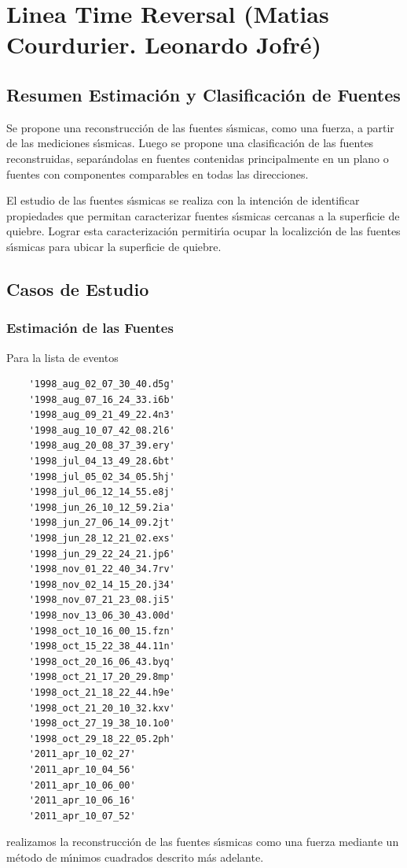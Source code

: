 
\chapter{Linea Time Reversal (Matias Courdurier. Leonardo Jofr\'e)}

\section{Resumen Estimaci\'on y Clasificaci\'on de Fuentes}

Se propone una reconstrucci\'on de las fuentes s\'{\i}smicas,
como una fuerza, a partir de las mediciones s\'{\i}smicas. Luego se propone
una clasificaci\'on de las fuentes reconstruidas, separ\'andolas en fuentes
contenidas principalmente en un plano o fuentes con componentes comparables
en todas las direcciones.

El estudio de las fuentes s\'{\i}smicas se realiza con la intenci\'on de identificar
propiedades que permitan caracterizar fuentes s\'{\i}smicas cercanas a la superficie
de quiebre. Lograr esta caracterizaci\'on permitir\'{\i}a ocupar la localizci\'on de las
fuentes s\'{\i}smicas para ubicar la superficie de quiebre.

\section{Casos de Estudio}

\subsection{Estimaci\'on de las Fuentes}

Para la lista de eventos
\begin{verbatim}
    '1998_aug_02_07_30_40.d5g'
    '1998_aug_07_16_24_33.i6b'
    '1998_aug_09_21_49_22.4n3'
    '1998_aug_10_07_42_08.2l6'
    '1998_aug_20_08_37_39.ery'
    '1998_jul_04_13_49_28.6bt'
    '1998_jul_05_02_34_05.5hj'
    '1998_jul_06_12_14_55.e8j'
    '1998_jun_26_10_12_59.2ia'
    '1998_jun_27_06_14_09.2jt'
    '1998_jun_28_12_21_02.exs'
    '1998_jun_29_22_24_21.jp6'
    '1998_nov_01_22_40_34.7rv'
    '1998_nov_02_14_15_20.j34'
    '1998_nov_07_21_23_08.ji5'
    '1998_nov_13_06_30_43.00d'
    '1998_oct_10_16_00_15.fzn'
    '1998_oct_15_22_38_44.11n'
    '1998_oct_20_16_06_43.byq'
    '1998_oct_21_17_20_29.8mp'
    '1998_oct_21_18_22_44.h9e'
    '1998_oct_21_20_10_32.kxv'
    '1998_oct_27_19_38_10.1o0'
    '1998_oct_29_18_22_05.2ph'
    '2011_apr_10_02_27'
    '2011_apr_10_04_56'
    '2011_apr_10_06_00'
    '2011_apr_10_06_16'
    '2011_apr_10_07_52'
\end{verbatim}
realizamos la reconstrucci\'on de
las fuentes s\'{\i}smicas como una fuerza
mediante un m\'etodo de m\'{\i}nimos cuadrados descrito m\'as adelante.

